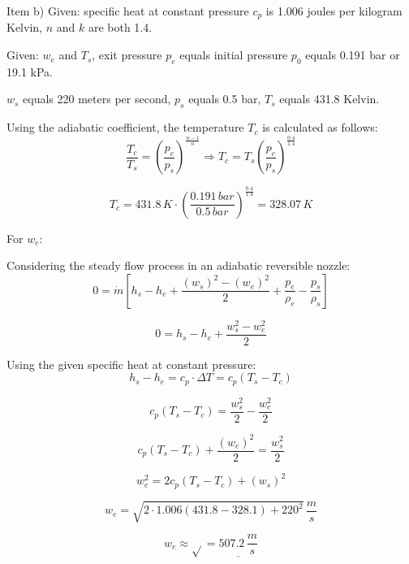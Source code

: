 Item b) Given: specific heat at constant pressure \( c_p \) is 1.006 joules per kilogram Kelvin, \( n \) and \( k \) are both 1.4.

Given: \( w_e \) and \( T_s \), exit pressure \( p_e \) equals initial pressure \( p_0 \) equals 0.191 bar or 19.1 kPa.

\( w_s \) equals 220 meters per second, \( p_s \) equals 0.5 bar, \( T_s \) equals 431.8 Kelvin.

Using the adiabatic coefficient, the temperature \( T_c \) is calculated as follows:
\[
\frac{T_c}{T_s} = \left( \frac{p_c}{p_s} \right)^{\frac{n-1}{n}} \Rightarrow T_c = T_s \left( \frac{p_c}{p_s} \right)^{\frac{0.4}{1.4}}
\]

\[
T_c = 431.8 \, K \cdot \left( \frac{0.191 \, bar}{0.5 \, bar} \right)^{\frac{0.4}{1.4}} = 328.07 \, K
\]

For \( w_e \):

Considering the steady flow process in an adiabatic reversible nozzle:
\[
0 = \dot{m} \left[ h_s - h_e + \frac{(w_s)^2 - (w_e)^2}{2} + \frac{p_e}{\rho_e} - \frac{p_s}{\rho_s} \right]
\]

\[
0 = h_s - h_e + \frac{w_s^2 - w_e^2}{2}
\]

Using the given specific heat at constant pressure:
\[
h_s - h_e = c_p \cdot \Delta T = c_p (T_s - T_c)
\]

\[
c_p (T_s - T_c) = \frac{w_s^2}{2} - \frac{w_e^2}{2}
\]

\[
c_p (T_s - T_c) + \frac{(w_e)^2}{2} = \frac{w_s^2}{2}
\]

\[
w_e^2 = 2 c_p (T_s - T_c) + (w_s)^2
\]

\[
w_e = \sqrt{2 \cdot 1.006 \left( 431.8 - 328.1 \right) + 220^2} \, \frac{m}{s}
\]

\[
w_e \approx \sqrt{\boxed{}} = \underline{507.2 \, \frac{m}{s}}
\]